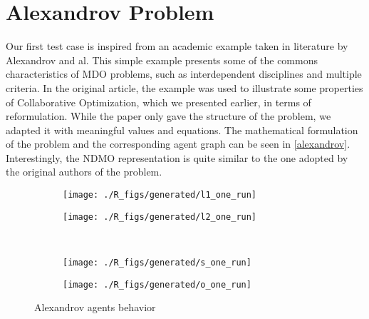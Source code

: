 \section{Alexandrov Problem}

Our first test case is inspired from an academic example taken in literature by Alexandrov and al\cite{alexandrov2002analytical}. This simple example presents some of the commons characteristics of MDO problems, such as interdependent disciplines and multiple criteria. In the original article, the example was used to illustrate some properties of Collaborative Optimization, which we presented earlier, in terms of reformulation. While the paper only gave the structure of the problem, we adapted it with meaningful values and equations.
The mathematical formulation of the problem and the corresponding agent graph can be seen in \figurename \ref{alexandrov}. Interestingly, the NDMO representation is quite similar to the one adopted by the original authors of the problem.

\begin{figure}
\centering
  	\begin{subfigure}[b]{0.4\textwidth}
		\centering
		\texttt{[image: ./R\_figs/generated/l1\_one\_run]}
		\label{alexandrov_res_one:l1}
	\end{subfigure}
	\begin{subfigure}[b]{0.4\textwidth}
		\centering
		\texttt{[image: ./R\_figs/generated/l2\_one\_run]}
		\label{alexandrov_res_one:l2}
	\end{subfigure}
	\vspace{-20pt}
	\\
	\begin{subfigure}[b]{0.4\textwidth}
		\centering
		\texttt{[image: ./R\_figs/generated/s\_one\_run]}
		\label{alexandrov_res_one:s}
	\end{subfigure}
	\begin{subfigure}[b]{0.4\textwidth}
		\centering
		\texttt{[image: ./R\_figs/generated/o\_one\_run]}
		\label{alexandrov_res_one:o}
	\end{subfigure}
	
	\caption{Alexandrov agents behavior}
	\label{alexandrov_res_one}

\end{figure}


